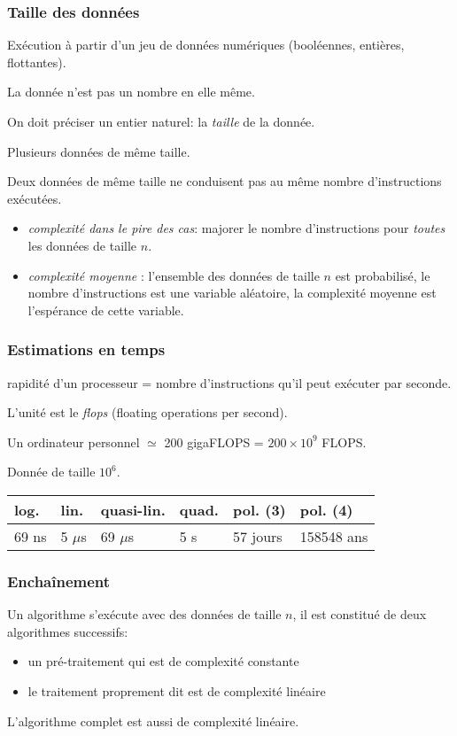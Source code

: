 \begin{frame}
  \frametitle{Taille des données}
Exécution à partir d'un jeu de données numériques (booléennes, entières, flottantes).

La donnée n'est pas un nombre en elle même.

On doit préciser un entier naturel: la \emph{taille} de la donnée.

Plusieurs données de même taille.

Deux données de même taille ne conduisent pas au même nombre d'instructions exécutées.
\begin{itemize}
  \item \emph{complexité dans le pire des cas}: majorer le nombre d'instructions pour \emph{toutes} les données de taille $n$.
  \item \emph{complexité moyenne} : l'ensemble des données de taille $n$ est probabilisé, le nombre d'instructions est une variable aléatoire, la complexité moyenne est l'espérance de cette variable.
\end{itemize}
\end{frame}

\begin{frame}
  \frametitle{Estimations en temps}
rapidité d'un processeur = nombre d'instructions qu'il peut exécuter par seconde.

L'unité est le \emph{flops} (floating operations per second).

Un ordinateur personnel $\simeq$ 200 gigaFLOPS = $200\times 10^{9}$ FLOPS.

Donnée de taille $10^{6}$.
\begin{center}
\renewcommand{\arraystretch}{1.5}
\begin{tabular}{|l|l|l|l|l|l|} \hline
log. & lin. & quasi-lin. & quad. & pol. (3) & pol. (4)\\ \hline
69 ns & 5 $\mu$s & 69 $\mu$s & 5 s & 57 jours & 158548 ans \\ \hline
\end{tabular}
\end{center}
\end{frame}

\begin{frame}
  \frametitle{Enchaînement}
Un algorithme s'exécute avec des données de taille $n$, il est constitué de deux algorithmes successifs:
\begin{itemize}
  \item un pré-traitement qui est de complexité constante
  \item le traitement proprement dit est de complexité linéaire  
\end{itemize}
L'algorithme complet est aussi de complexité linéaire.
\end{frame}

